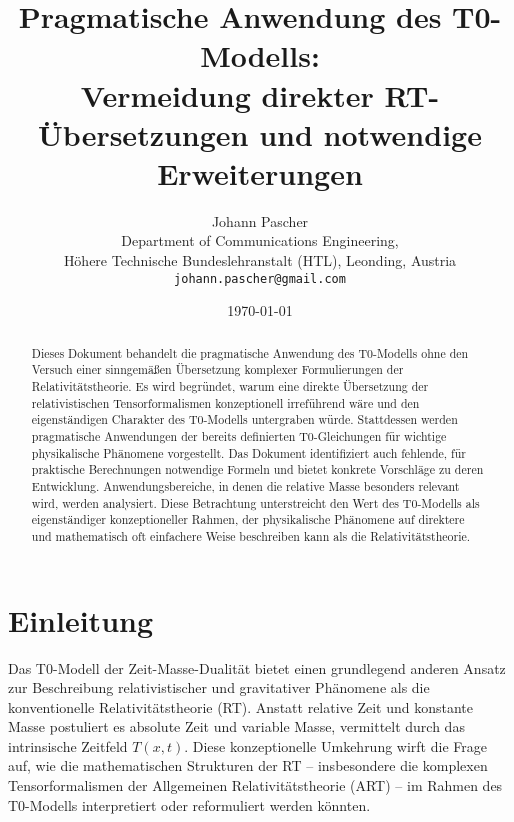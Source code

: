 \documentclass[12pt,a4paper]{article}
\newcommand{\Tfieldt}{T(x,t)}
\begin{document}
	
	\title{Pragmatische Anwendung des T0-Modells:\\Vermeidung direkter RT-Übersetzungen und notwendige Erweiterungen}
	\author{Johann Pascher\\
		Department of Communications Engineering, \\Höhere Technische Bundeslehranstalt (HTL), Leonding, Austria\\
		\texttt{johann.pascher@gmail.com}}
	\date{\today}
	
	\maketitle
	
	\begin{abstract}
		Dieses Dokument behandelt die pragmatische Anwendung des T0-Modells ohne den Versuch einer sinngemäßen Übersetzung komplexer Formulierungen der Relativitätstheorie. Es wird begründet, warum eine direkte Übersetzung der relativistischen Tensorformalismen konzeptionell irreführend wäre und den eigenständigen Charakter des T0-Modells untergraben würde. Stattdessen werden pragmatische Anwendungen der bereits definierten T0-Gleichungen für wichtige physikalische Phänomene vorgestellt. Das Dokument identifiziert auch fehlende, für praktische Berechnungen notwendige Formeln und bietet konkrete Vorschläge zu deren Entwicklung. Anwendungsbereiche, in denen die relative Masse besonders relevant wird, werden analysiert. Diese Betrachtung unterstreicht den Wert des T0-Modells als eigenständiger konzeptioneller Rahmen, der physikalische Phänomene auf direktere und mathematisch oft einfachere Weise beschreiben kann als die Relativitätstheorie.
	\end{abstract}
	\newpage
	\tableofcontents
	\newpage
	\section{Einleitung}
	\label{sec:introduction}
	
	Das T0-Modell der Zeit-Masse-Dualität bietet einen grundlegend anderen Ansatz zur Beschreibung relativistischer und gravitativer Phänomene als die konventionelle Relativitätstheorie (RT). Anstatt relative Zeit und konstante Masse postuliert es absolute Zeit und variable Masse, vermittelt durch das intrinsische Zeitfeld $\Tfieldt$. Diese konzeptionelle Umkehrung wirft die Frage auf, wie die mathematischen Strukturen der RT – insbesondere die komplexen Tensorformalismen der Allgemeinen Relativitätstheorie (ART) – im Rahmen des T0-Modells interpretiert oder reformuliert werden könnten.
	
\end{document}
